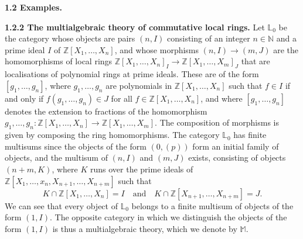 \documentclass{article}
\newenvironment{rmenv}[1]
  {\phantomsection\par\medskip\noindent\textbf{#1.}\rmfamily}
  {\par\medskip}
\newcommand{\bb}[1]{{\mathbb{#1}}}
\begin{document}
\begin{rmenv}{1.2 Examples}
  \begin{rmenv}{1.2.2 The multialgebraic theory of commutative local rings}
  \label{1.2.2}
    Let $\bb{L}_0$ be the category whose objects are pairs $(n,I)$ consisting of an integer $n\in\bb{N}$ and a prime ideal $I$ of $\bb{Z}[X_1,\ldots,X_n]$, and whose morphisms $(n,I)\to(m,J)$ are the homomorphisms of local rings $\bb{Z}[X_1,\ldots,X_n]_I\to\bb{Z}[X_1,\ldots,X_m]_J$ that are localisations of polynomial rings at prime ideals.
    These are of the form $[g_1,\ldots,g_n]$, where $g_1,\ldots,g_n$ are polynomials in $\bb{Z}[X_1,\ldots,X_n]$ such that $f\in I$ if and only if $f(g_1,\ldots,g_n)\in J$ for all $f\in\bb{Z}[X_1,\ldots,X_n]$, and where $[g_1,\ldots,g_n]$ denotes the extension to fractions of the homomorphism $g_1,\ldots,g_n\colon\bb{Z}[X_1,\ldots,X_n]\to\bb{Z}[X_1,\ldots,X_m]$.
    The composition of morphisms is given by composing the ring homomorphisms.
    The category $\bb{L}_0$ has finite multisums since the objects of the form $(0,(p))$ form an initial family of objects, and the multisum of $(n,I)$ and $(m,J)$ exists, consisting of objects $(n+m,K)$, where $K$ runs over the prime ideals of $\bb{Z}[X_1,\ldots,x_n,X_{n+1},\ldots,X_{n+m}]$ such that
    \[
      K\cap\bb{Z}[X_1,\ldots,X_n] = I
      \quad\text{and}\quad
      K\cap\bb{Z}[X_{n+1},\ldots,X_{n+m}] = J.
    \]
    We can see that every object of $\bb{L}_0$ belongs to a finite multisum of objects of the form $(1,I)$.
    The opposite category in which we distinguish the objects of the form $(1,I)$ is thus a multialgebraic theory, which we denote by $\bb{M}$.


\end{rmenv}
\end{rmenv}
\end{document}

